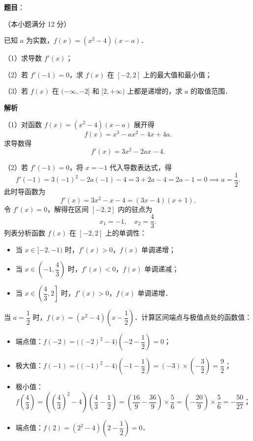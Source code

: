 \begin{answer}

\textbf{题目}：

（本小题满分 12 分）

已知 $a$ 为实数，$f(x) = (x^2 - 4)(x - a)$．

（1）求导数 $f'(x)$；

（2）若 $f'(-1) = 0$，求 $f(x)$ 在 $[-2, 2]$ 上的最大值和最小值；

（3）若 $f(x)$ 在 $(-\infty, -2]$ 和 $[2, +\infty)$ 上都是递增的，求 $a$ 的取值范围．

\textbf{解析}

（1）对函数 $f(x) = (x^2 - 4)(x - a)$ 展开得
\nopagebreak[4]
\[
f(x) = x^3 - ax^2 - 4x + 4a.
\]
求导数得
\nopagebreak[4]
\[
f'(x) = 3x^2 - 2ax - 4.
\]

（2）若 $f'(-1) = 0$，将 $x = -1$ 代入导数表达式，得
\nopagebreak[4]
\[
f'(-1) = 3(-1)^2 - 2a(-1) - 4 = 3 + 2a - 4 = 2a - 1 = 0 \implies a = \frac{1}{2}.
\]
此时导函数为
\nopagebreak[4]
\[
f'(x) = 3x^2 - x - 4 = (3x - 4)(x + 1).
\]
令 $f'(x) = 0$，解得在区间 $[-2, 2]$ 内的驻点为
\nopagebreak[4]
\[
x_1 = -1, \quad x_2 = \frac{4}{3}.
\]
列表分析函数 $f(x)$ 在 $[-2, 2]$ 上的单调性：
\begin{itemize}
\item 当 $x \in [-2, -1)$ 时，$f'(x) > 0$，$f(x)$ 单调递增；
\item 当 $x \in \left(-1, \dfrac{4}{3}\right)$ 时，$f'(x) < 0$，$f(x)$ 单调递减；
\item 当 $x \in \left(\dfrac{4}{3}, 2\right]$ 时，$f'(x) > 0$，$f(x)$ 单调递增．
\end{itemize}

当 $a = \dfrac{1}{2}$ 时，$f(x) = (x^2 - 4)\left(x - \dfrac{1}{2}\right)$．计算区间端点与极值点处的函数值：
\begin{itemize}
\item 端点值：$f(-2) = \big((-2)^2 - 4\big)\left(-2 - \dfrac{1}{2}\right) = 0$；
\item 极大值：$f(-1) = \big((-1)^2 - 4\big)\left(-1 - \dfrac{1}{2}\right) = (-3) \times \left(-\dfrac{3}{2}\right) = \dfrac{9}{2}$；
\item 极小值：$f\left(\dfrac{4}{3}\right) = \left(\left(\dfrac{4}{3}\right)^2 - 4\right)\left(\dfrac{4}{3} - \dfrac{1}{2}\right) = \left(\dfrac{16}{9} - \dfrac{36}{9}\right) \times \dfrac{5}{6} = \left(-\dfrac{20}{9}\right) \times \dfrac{5}{6} = -\dfrac{50}{27}$；
\item 端点值：$f(2) = (2^2 - 4)\left(2 - \dfrac{1}{2}\right) = 0$．
\end{itemize}


\end{answer}
